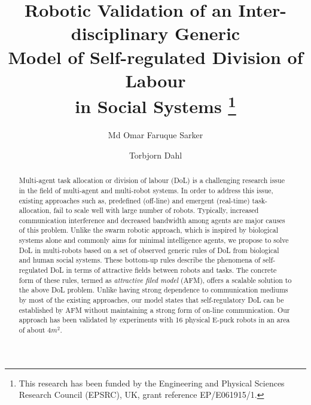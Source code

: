 \documentclass{llncs}
\begin{document}
\title{Robotic Validation of an Inter-disciplinary Generic\\
Model of Self-regulated Division of Labour\\ in Social Systems
\thanks{This research has been funded by the Engineering and Physical Sciences Research Council (EPSRC), UK, grant reference EP/E061915/1.}
}
\author{Md Omar Faruque Sarker \and
Torbjorn Dahl %
}
\maketitle
\begin{abstract}
Multi-agent task allocation or division of labour (DoL) is a challenging research issue in the field of multi-agent and multi-robot systems. In order to address this issue, existing approaches such as, predefined (off-line) and emergent (real-time) task-allocation, fail to scale well with large number of robots. Typically, increased communication interference and decreased bandwidth among agents are major causes of this problem. Unlike the swarm robotic approach, which is inspired by biological systems alone and commonly aims for minimal intelligence agents, we propose to solve DoL in multi-robots based on a set of observed generic rules of DoL from biological and human social systems. These bottom-up rules describe the phenomena of self-regulated DoL in terms of attractive fields between robots and tasks. The concrete form of these rules, termed as \textit{attractive filed model} (AFM), offers a scalable solution to the above DoL problem. Unlike having strong dependence to communication mediums by most of the existing approaches, our model states that self-regulatory DoL can be established by AFM without maintaining a strong form of on-line communication. Our approach has been validated by experiments with 16 physical E-puck robots in an area of about 4$m^2$.
\end{abstract}
\end{document}
